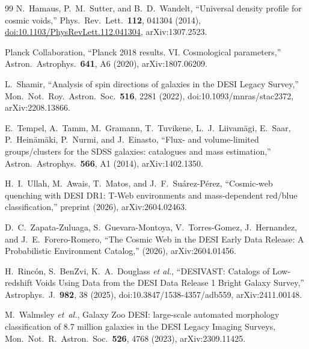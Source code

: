 \documentclass[twocolumn,linenumbers]{aastex702}
\begin{document}
\begin{thebibliography}{99}
N.~Hamaus, P.~M.~Sutter, and B.~D.~Wandelt,
``Universal density profile for cosmic voids,''
Phys.\ Rev.\ Lett.\ \textbf{112}, 041304 (2014),
\href{https://doi.org/10.1103/PhysRevLett.112.041304}{doi:10.1103/PhysRevLett.112.041304},
arXiv:1307.2523.

Planck Collaboration,
``Planck 2018 results. VI. Cosmological parameters,''
Astron.\ Astrophys.\ \textbf{641}, A6 (2020),
arXiv:1807.06209.

L.~Shamir,
``Analysis of spin directions of galaxies in the DESI Legacy
Survey,''
Mon.\ Not.\ Roy.\ Astron.\ Soc.\ \textbf{516}, 2281 (2022),
doi:10.1093/mnras/stac2372, arXiv:2208.13866.

E.~Tempel, A.~Tamm, M.~Gramann, T.~Tuvikene, L.~J.~Liivam\"agi,
E.~Saar, P.~Hein\"am\"aki, P.~Nurmi, and J.~Einasto,
``Flux- and volume-limited groups/clusters for the SDSS galaxies:
catalogues and mass estimation,'' Astron.\ Astrophys.\ \textbf{566},
A1 (2014), arXiv:1402.1350.

H.~I.~Ullah, M.~Awais, T.~Matos, and J.~F.~Su\'arez-P\'erez,
``Cosmic-web quenching with DESI DR1: T-Web environments and
mass-dependent red/blue classification,''
preprint (2026), arXiv:2604.02463.

D.~C.~Zapata-Zuluaga, S.~Guevara-Montoya, V.~Torres-Gomez,
J.~Hernandez, and J.~E.~Forero-Romero, ``The Cosmic Web in the DESI
Early Data Release: A Probabilistic Environment Catalog,'' (2026),
arXiv:2604.01456.

H.~Rinc\'on, S.~BenZvi, K.~A.~Douglass \textit{et al.},
``DESIVAST: Catalogs of Low-redshift Voids Using Data from the DESI
Data Release 1 Bright Galaxy Survey,'' Astrophys.\ J.\ \textbf{982},
38 (2025), doi:10.3847/1538-4357/adb559, arXiv:2411.00148.

M.~Walmsley \emph{et~al.}, Galaxy Zoo DESI: large-scale automated
morphology classification of 8.7 million galaxies in the DESI Legacy
Imaging Surveys, Mon.\ Not.\ R.\ Astron.\ Soc.\ \textbf{526}, 4768 (2023),
arXiv:2309.11425.

\end{thebibliography}
\end{document}

